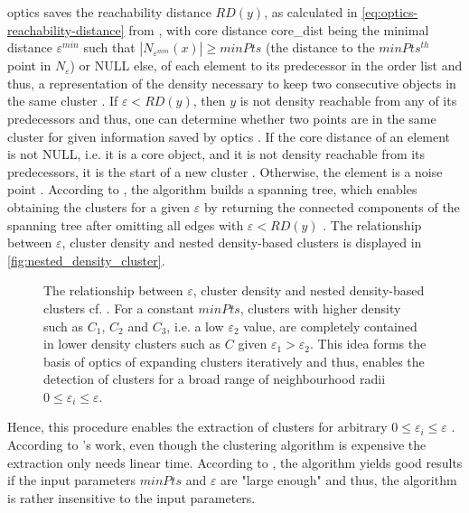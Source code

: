 \ac{optics} saves the reachability distance $RD(y)$, as calculated in \autoref{eq:optics-reachability-distance} from \cite{OPTICS2013},
with core distance core\_dist being the minimal distance $\varepsilon^{min}$ such that $| N_{\varepsilon^{min}} (x) | \geq minPts$ 
(the distance to the $minPts^{th}$ point in $N_\varepsilon$) or NULL else, 
of each element to its predecessor in the order list and thus, 
a representation of the density necessary to keep two consecutive objects in the same cluster \cite{OPTICS2013}.
If $\varepsilon < RD(y)$, then $y$ is not density reachable from any of its predecessors and thus, 
one can determine whether two points are in the same cluster for given information saved by \ac{optics} \cite{OPTICS2013, OPTICS1999}.
If the core distance of an element is not NULL, i.e. it is a core object, and it is not density reachable from its predecessors, it is the start of a new cluster \cite{OPTICS1999}.
Otherwise, the element is a noise point \cite{OPTICS1999}.
According to \citeauthor{OPTICS2013}, the algorithm builds a spanning tree, which enables obtaining the clusters for a given $\varepsilon$ by returning the connected components 
of the spanning tree after omitting all edges with $\varepsilon < RD(y)$ \cite{OPTICS2013}.
The relationship between $\varepsilon$, cluster density and nested density-based clusters is displayed in \autoref{fig:nested_density_cluster}.

\begin{figure}[htp] %
    \centering
    
    \caption{The relationship between $\varepsilon$, cluster density and nested density-based clusters cf. \cite{OPTICS1999}.
    For a constant $minPts$, clusters with higher density such as $C_1$, $C_2$ and $C_3$, i.e. a low $\varepsilon_2$ value, 
    are completely contained in lower density clusters such as $C$ given $\varepsilon_1 > \varepsilon_2$.
    This idea forms the basis of \ac{optics} of expanding clusters iteratively and thus, 
    enables the detection of clusters for a broad range of neighbourhood radii $0 \le \varepsilon_i \le \varepsilon$.
    }
    \label{fig:nested_density_cluster}
\end{figure}

Hence, this procedure enables the extraction of clusters for arbitrary $0 \le \varepsilon_i \le \varepsilon$ \cite{OPTICS_kMeans_2016, OPTICS1999}.
According to \citeauthor{OPTICS2013}'s work, even though the clustering algorithm is expensive the extraction only needs linear time.
According to \cite{OPTICS1999}, the algorithm yields good results if the input parameters $minPts$ and $\varepsilon$ are "large enough" and thus, the algorithm is rather insensitive to the input parameters.

